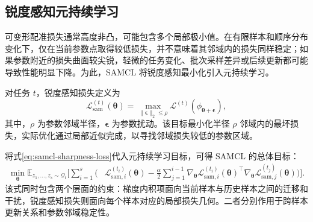 \subsection{锐度感知元持续学习}
\label{subsec:samcl-sharpness-update}

可变形配准损失通常高度非凸，可能包含多个局部极小值\cite{hill2001registration}。在有限样本和顺序分布变化下，仅在当前参数点取得较低损失，并不意味着其邻域内的损失同样稳定；如果参数附近的损失曲面较尖锐，轻微的任务变化、批次采样差异或后续更新都可能导致性能明显下降。为此，SAMCL 将锐度感知最小化引入元持续学习\cite{foret2021sam}。

对任务 $t$，锐度感知损失定义为
\begin{equation}
\mathcal{L}^{(t)}_{\mathrm{sam}}(\boldsymbol{\theta})
=
\max_{\|\boldsymbol{\epsilon}\|_2\leq\rho}
\mathcal{L}^{(t)}
\left(\phi_{\boldsymbol{\theta}+\boldsymbol{\epsilon}}\right),
\label{eq:samcl-sharpness-loss}
\end{equation}
其中，$\rho$ 为参数邻域半径，$\boldsymbol{\epsilon}$ 为参数扰动。该目标最小化半径 $\rho$ 邻域内的最坏损失，实际优化通过局部近似完成，以寻找邻域损失较低的参数区域。

将式\eqref{eq:samcl-sharpness-loss}代入元持续学习目标，可得 SAMCL 的总体目标：
\begin{equation}
\begin{aligned}
\min_{\boldsymbol{\theta}}
\mathbb{E}_{z_1,\ldots,z_s\sim\mathcal{Q}_t}
\Bigg[
\sum_{i=1}^{s}
\Bigg(&
\mathcal{L}^{(t_i)}_{\mathrm{sam},i}(\boldsymbol{\theta})
-
\frac{\alpha}{2}
\sum_{j=1}^{i-1}
\nabla_{\boldsymbol{\theta}}
\mathcal{L}^{(t_i)}_{\mathrm{sam},i}(\boldsymbol{\theta})^{\top}
\nabla_{\boldsymbol{\theta}}
\mathcal{L}^{(t_j)}_{\mathrm{sam},j}(\boldsymbol{\theta})
\Bigg)
\Bigg].
\end{aligned}
\label{eq:samcl-full-objective}
\end{equation}
该式同时包含两个层面的约束：梯度内积项面向当前样本与历史样本之间的迁移和干扰，锐度感知损失则面向每个样本对应的局部损失几何。二者分别作用于跨样本更新关系和参数邻域稳定性。

